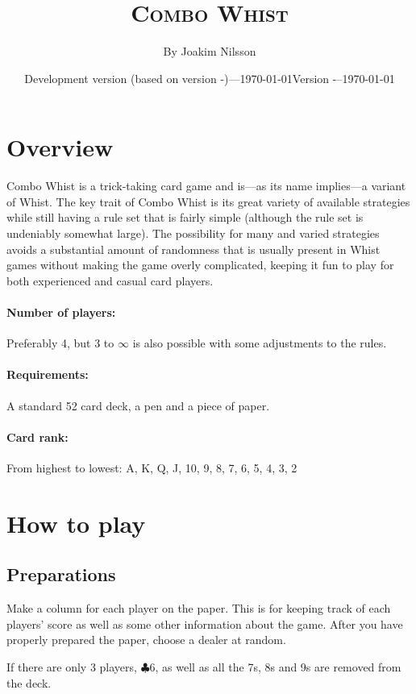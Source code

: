 \documentclass[a4paper]{article}
\title{\textsc{Combo Whist}}
\author{By Joakim Nilsson}
\date{Development version (based on version \varVersion-\varLanguage)---\today}
\date{Version \varVersion-\varLanguage\---\today}
\begin{document}
	\introPages

	\noindent

	\pagebreak

	\section{Overview}
		Combo Whist is a trick-taking card game and is---as its name implies---a variant of Whist. The key trait of Combo Whist is its great variety of available strategies while still having a rule set that is fairly simple (although the rule set is undeniably somewhat large). The possibility for many and varied strategies avoids a substantial amount of randomness that is usually present in Whist games without making the game overly complicated, keeping it fun to play for both experienced and casual card players.

		\paragraph{Number of players:}
			Preferably 4, but 3 to $\infty$ is also possible with some adjustments to the rules.

		\paragraph{Requirements:}
			A standard 52 card deck, a pen and a piece of paper.

		\paragraph{Card rank:}
			From highest to lowest: A, K, Q, J, 10, 9, 8, 7, 6, 5, 4, 3, 2

	\section{How to play}
		\subsection{Preparations}
			Make a column for each player on the paper. This is for keeping track of each players' score as well as some other information about the game. After you have properly prepared the paper, choose a dealer at random.

			If there are only 3 players, $\clubsuit 6$, as well as all the 7s, 8s and 9s are removed from the deck.
\end{document}
